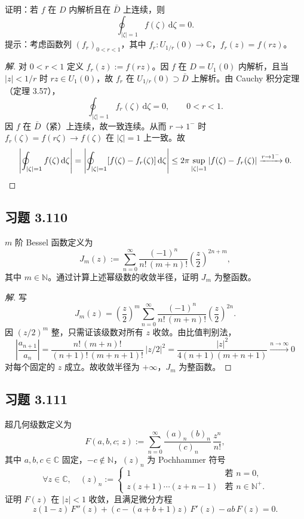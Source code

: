 \documentclass[11pt,a4paper]{article}
\newcommand{\C}{\mathbb{C}}
\newcommand{\N}{\mathbb{N}}
\newcommand{\dd}{\mathrm{d}}
\theoremstyle{definition}
\newenvironment{solution}{\begin{proof}[解]}{\end{proof}}
\begin{document}
证明：若 $f$ 在 $D$ 内解析且在 $\bar{D}$ 上连续，则
\[
  \oint_{|\zeta|=1} f(\zeta)\,\dd\zeta = 0.
\]
提示：考虑函数列 $(f_r)_{0<r<1}$，其中 $f_r \colon U_{1/r}(0) \to \C$，$f_r(z) = f(rz)$。

\begin{solution}
  对 $0 < r < 1$ 定义 $f_r(z) := f(rz)$。因 $f$ 在 $D = U_1(0)$ 内解析，且当 $|z| < 1/r$ 时 $rz \in U_1(0)$，故 $f_r$ 在 $U_{1/r}(0) \supset \bar{D}$ 上解析。由 Cauchy 积分定理（定理 3.57），
  \[
    \oint_{|\zeta|=1} f_r(\zeta)\,\dd\zeta = 0, \qquad 0 < r < 1.
  \]
  因 $f$ 在 $\bar{D}$（紧）上连续，故一致连续。从而 $r \to 1^-$ 时 $f_r(\zeta) = f(r\zeta) \to f(\zeta)$ 在 $|\zeta| = 1$ 上一致。故
  \[
    \left|\oint_{|\zeta|=1} f(\zeta)\,\dd\zeta\right|
    = \left|\oint_{|\zeta|=1} [f(\zeta) - f_r(\zeta)]\,\dd\zeta\right|
    \le 2\pi\sup_{|\zeta|=1}|f(\zeta) - f_r(\zeta)|
    \xrightarrow{r\to 1^-}0.\qedhere
  \]
\end{solution}

\subsection{习题 3.110}

$m$ 阶 Bessel 函数定义为
\[
  J_m(z) := \sum_{n=0}^{\infty}
  \frac{(-1)^n}{n!\,(m+n)!}
  \left(\frac{z}{2}\right)^{2n+m},
\]
其中 $m \in \N$。通过计算上述幂级数的收敛半径，证明 $J_m$ 为整函数。

\begin{solution}
  写
  \[
    J_m(z) = \left(\frac{z}{2}\right)^{\!m}
    \sum_{n=0}^{\infty}
    \frac{(-1)^n}{n!\,(m+n)!}\left(\frac{z}{2}\right)^{\!2n}.
  \]
  因 $(z/2)^m$ 整，只需证该级数对所有 $z$ 收敛。由比值判别法，
  \[
    \left|\frac{a_{n+1}}{a_n}\right|
    = \frac{n!\,(m+n)!}{(n+1)!\,(m+n+1)!}\,|z/2|^2
    = \frac{|z|^2}{4(n+1)(m+n+1)}
    \xrightarrow{n\to\infty}0
  \]
  对每个固定的 $z$ 成立。故收敛半径为 $+\infty$，$J_m$ 为整函数。\qedhere
\end{solution}

\subsection{习题 3.111}

超几何级数定义为
\[
  F(a,b,c;\,z) := \sum_{n=0}^{\infty}
  \frac{(a)_n\,(b)_n}{(c)_n}\,\frac{z^n}{n!},
\]
其中 $a, b, c \in \C$ 固定，$-c \notin \N$，$(z)_n$ 为 Pochhammer 符号
\[
  \forall z \in \C,\quad (z)_n :=
  \begin{cases} 1 & \text{若 } n = 0, \\[2pt]
    z(z+1)\cdots(z+n-1) & \text{若 } n \in \N^+.
  \end{cases}
\]
证明 $F(z)$ 在 $|z|<1$ 收敛，且满足微分方程
\[
  z(1-z)\,F''(z) + (c-(a+b+1)z)\,F'(z) - ab\,F(z) = 0.
\]
\end{document}
